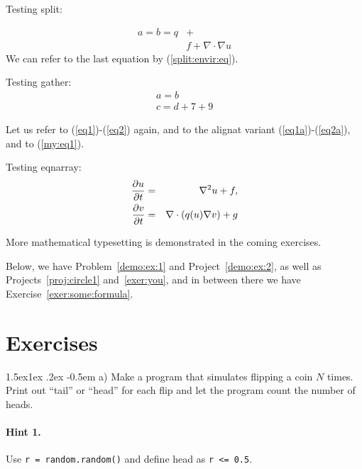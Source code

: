 \n\documentclass[%
oneside,                 %
final,                   %
10pt]{article}
\makeatletter
\newenvironment{doconceexercise}{}{}
\newcounter{doconceexercisecounter}
\newcommand\subex{\@startsection{paragraph}{4}{\z@}%
                  {1.5ex\@plus1ex \@minus.2ex}%
                  {-0.5em}%
                  {\normalfont\normalsize\bfseries}}
\theoremstyle{definition}
\makeatother
\begin{document}
\begin{enumerate}
Testing split:

\begin{equation}
\label{split:envir:eq}
\begin{split}
a = b = q &+ \\ 
  & f + \nabla\cdot\nabla u
\end{split}
\end{equation}
We can refer to the last equation by (\ref{split:envir:eq}).

Testing gather:
\begin{gather}
a = b \\ 
c = d + 7 + 9
\end{gather}

Let us refer to (\ref{eq1})-(\ref{eq2}) again, and to the
alignat variant (\ref{eq1a})-(\ref{eq2a}), and to (\ref{my:eq1}).

Testing eqnarray:
\begin{eqnarray}
{\partial u\over\partial t} &=& \nabla^2 u + f, \label{myeq1}\\ 
{\partial v\over\partial t} &=& \nabla\cdot(q(u)\nabla v) + g \label{myeq2}
\end{eqnarray}

More mathematical typesetting is demonstrated in the coming exercises.

Below, we have Problem~\vref{demo:ex:1} and Project~\vref{demo:ex:2},
as well as Projects~\vref{proj:circle1} and~\vref{exer:you}, and in
between there we have Exercise~\vref{exer:some:formula}.

\section{Exercises}

\begin{doconceexercise}

                             
\label{demo:ex:1}


\subex{a)}
Make a program that simulates flipping a coin $N$ times.
Print out ``tail'' or ``head'' for each flip and
let the program count the number of heads.


\paragraph{Hint 1.}
Use \texttt{r = random.random()} and define head as \texttt{r <= 0.5}.


\end{doconceexercise}
\end{enumerate}
\end{document}
